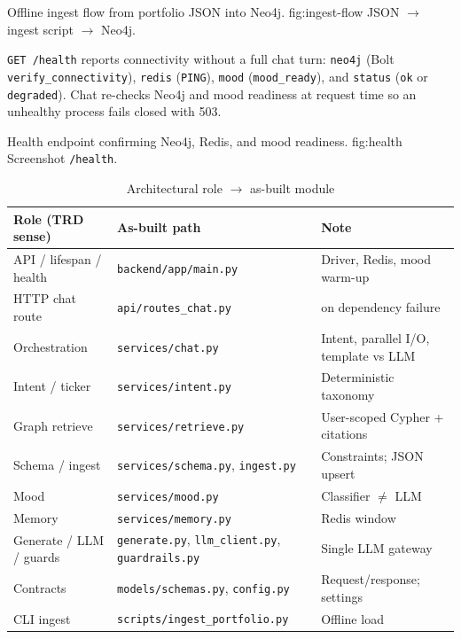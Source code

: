 %
{Offline ingest flow from portfolio JSON into Neo4j.}%
{fig:ingest-flow}%
{JSON $\rightarrow$ ingest script $\rightarrow$ Neo4j.}

\texttt{GET /health} reports connectivity without a full chat turn: \texttt{neo4j} (Bolt \texttt{verify\_connectivity}), \texttt{redis} (\texttt{PING}), \texttt{mood} (\texttt{mood\_ready}), and \texttt{status} (\texttt{ok} or \texttt{degraded}). Chat re-checks Neo4j and mood readiness at request time so an unhealthy process fails closed with 503.

%
{Health endpoint confirming Neo4j, Redis, and mood readiness.}%
{fig:health}%
{Screenshot \texttt{/health}.}

\begin{table}[!htbp]
\centering
\small
\caption{Architectural role $\rightarrow$ as-built module}
\label{tab:source-tree}
\begin{tabularx}{\textwidth}{@{}
  >{\raggedright\arraybackslash}p{}
  >{\raggedright\arraybackslash}p{}
  >{\raggedright\arraybackslash}X
  @{}}
\toprule
\textbf{Role (TRD sense)} & \textbf{As-built path} & \textbf{Note} \\
\midrule
API / lifespan / health & \texttt{backend/app/main.py} & Driver, Redis, mood warm-up \\
\addlinespace
HTTP chat route & \texttt{api/routes\_chat.py} & 503 on dependency failure \\
\addlinespace
Orchestration & \texttt{services/chat.py} & Intent, parallel I/O, template vs LLM \\
\addlinespace
Intent / ticker & \texttt{services/intent.py} & Deterministic taxonomy \\
\addlinespace
Graph retrieve & \texttt{services/retrieve.py} & User-scoped Cypher + citations \\
\addlinespace
Schema / ingest & \texttt{services/schema.py}, \texttt{ingest.py} & Constraints; JSON upsert \\
\addlinespace
Mood & \texttt{services/mood.py} & Classifier $\neq$ LLM \\
\addlinespace
Memory & \texttt{services/memory.py} & Redis window \\
\addlinespace
Generate / LLM / guards & \texttt{generate.py}, \texttt{llm\_client.py}, \texttt{guardrails.py} & Single LLM gateway \\
\addlinespace
Contracts & \texttt{models/schemas.py}, \texttt{config.py} & Request/response; settings \\
\addlinespace
CLI ingest & \texttt{scripts/ingest\_portfolio.py} & Offline load \\
\bottomrule
\end{tabularx}
\end{table}
